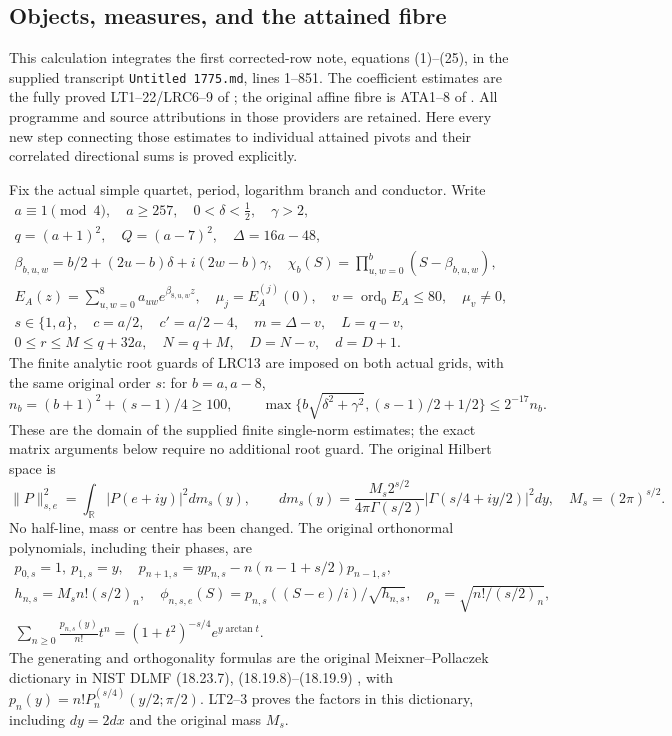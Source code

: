 \subsection{Objects, measures, and the attained fibre}
This calculation integrates the first corrected-row note, equations
(1)--(25), in the supplied transcript \texttt{Untitled 1775.md}, lines
1--851. The coefficient estimates are the fully proved LT1--22/LRC6--9
of ; the original affine fibre is
ATA1--8 of .
All programme and source attributions in those providers are retained.
Here every new step connecting those estimates to individual attained
pivots and their correlated directional sums is proved explicitly.

Fix the actual simple quartet, period, logarithm branch and conductor.
Write
\[
\begin{gathered}
a\equiv1\pmod4,\quad a\ge257,\quad 0<\delta<\tfrac12,\quad\gamma>2,\\
q=(a+1)^2,\quad Q=(a-7)^2,\quad\Delta=16a-48,\\
\beta_{b,u,w}=b/2+(2u-b)\delta+i(2w-b)\gamma,
\quad\chi_b(S)=\prod_{u,w=0}^{b}(S-\beta_{b,u,w}),\\
E_A(z)=\sum_{u,w=0}^{8}a_{uw}e^{\beta_{8,u,w}z},\quad
\mu_j=E_A^{(j)}(0),\quad v=\operatorname{ord}_0 E_A\le80,
\quad\mu_v\ne0,\\
s\in\{1,a\},\quad c=a/2,\quad c'=a/2-4,\quad
m=\Delta-v,\quad L=q-v,\\
0\le r\le M\le q+32a,\quad N=q+M,\quad D=N-v,\quad d=D+1.
\end{gathered}\tag{CRP1}
\]
The finite analytic root guards of LRC13 are imposed on both actual
grids, with the same original order $s$: for $b=a,a-8$,
\[
n_b=(b+1)^2+(s-1)/4\ge100,\qquad
\max\{b\sqrt{\delta^2+\gamma^2},(s-1)/2+1/2\}\le2^{-17}n_b.
\tag{CRP2}
\]
These are the domain of the supplied finite single-norm estimates;
the exact matrix arguments below require no additional root guard.
The original Hilbert space is
\[
\|P\|_{s,e}^2=\int_{\mathbb R}|P(e+iy)|^2dm_s(y),\qquad
dm_s(y)=\frac{M_s2^{s/2}}{4\pi\Gamma(s/2)}
 |\Gamma(s/4+iy/2)|^2dy,\quad M_s=(2\pi)^{s/2}.\tag{CRP3}
\]
No half-line, mass or centre has been changed. The original orthonormal
polynomials, including their phases, are
\[
\begin{gathered}
p_{0,s}=1,\ p_{1,s}=y,\quad
p_{n+1,s}=yp_{n,s}-n(n-1+s/2)p_{n-1,s},\\
h_{n,s}=M_sn!(s/2)_n,\quad
\phi_{n,s,e}(S)=p_{n,s}((S-e)/i)/\sqrt{h_{n,s}},\quad
\rho_n=\sqrt{n!/(s/2)_n},\\
\sum_{n\ge0}\frac{p_{n,s}(y)}{n!}t^n
 =(1+t^2)^{-s/4}e^{y\arctan t}.\tag{CRP4}
\end{gathered}
\]
The generating and orthogonality formulas are the original
Meixner--Pollaczek dictionary in NIST DLMF (18.23.7), (18.19.8)--(18.19.9)
\cite{human:dlmf18}, with $p_n(y)=n!P_n^{(s/4)}(y/2;\pi/2)$.
LT2--3 proves the factors in this dictionary, including $dy=2dx$ and
the original mass $M_s$.


